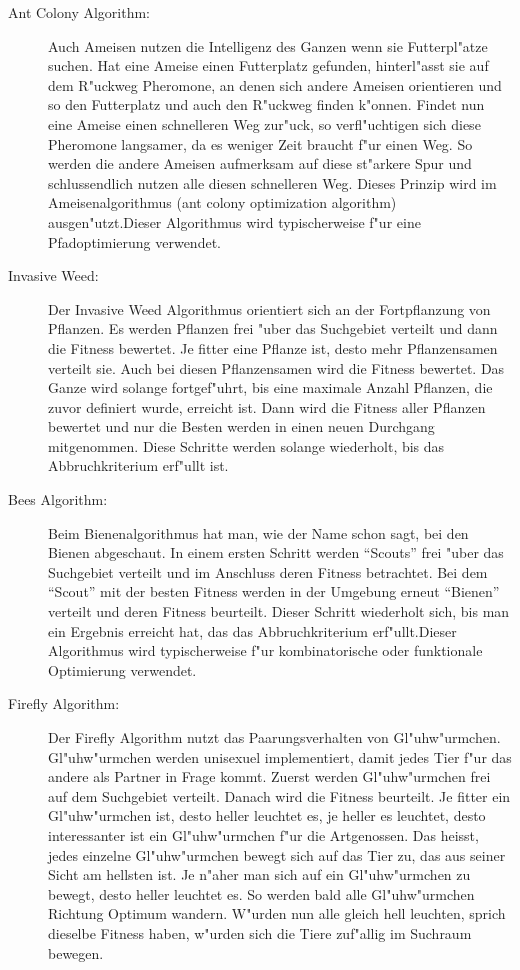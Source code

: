 \begin{description}
\item[Ant Colony Algorithm:]
Auch Ameisen nutzen die Intelligenz des Ganzen wenn sie Futterpl"atze
suchen. Hat eine Ameise einen Futterplatz gefunden, hinterl"asst sie
auf dem R"uckweg Pheromone, an denen sich andere Ameisen orientieren
und so den Futterplatz und auch den R"uckweg finden k"onnen. Findet
nun eine Ameise einen schnelleren Weg zur"uck, so verfl"uchtigen
sich diese Pheromone langsamer, da es weniger Zeit braucht f"ur einen
Weg. So werden die andere Ameisen aufmerksam auf diese st"arkere Spur und
schlussendlich nutzen alle diesen schnelleren Weg. Dieses Prinzip wird im
Ameisenalgorithmus (ant colony optimization algorithm) ausgen"utzt.Dieser
Algorithmus wird typischerweise f"ur eine Pfadoptimierung verwendet.

\item [Invasive Weed:]
Der Invasive Weed Algorithmus orientiert sich an der Fortpflanzung
von Pflanzen. Es werden Pflanzen frei "uber das Suchgebiet verteilt
und dann die Fitness bewertet. Je fitter eine Pflanze ist, desto mehr
Pflanzensamen verteilt sie. Auch bei diesen Pflanzensamen wird die
Fitness bewertet. Das Ganze wird solange fortgef"uhrt, bis eine maximale
Anzahl Pflanzen, die zuvor definiert wurde, erreicht ist. Dann wird
die Fitness aller Pflanzen bewertet und nur die Besten werden in einen
neuen Durchgang mitgenommen. Diese Schritte werden solange wiederholt,
bis das Abbruchkriterium erf"ullt ist.
		

\item [Bees Algorithm:]
Beim Bienenalgorithmus hat man, wie der Name schon sagt, bei den Bienen
abgeschaut.
In einem ersten Schritt werden ``Scouts''
frei "uber das Suchgebiet verteilt und im Anschluss deren Fitness
betrachtet. Bei dem ``Scout'' mit der besten
Fitness werden in der Umgebung erneut ``Bienen''
verteilt und deren Fitness beurteilt. Dieser Schritt wiederholt sich, bis
man ein Ergebnis erreicht hat, das das Abbruchkriterium erf"ullt.Dieser
Algorithmus wird typischerweise f"ur kombinatorische oder funktionale
Optimierung verwendet.

\item[Firefly Algorithm:]
Der Firefly Algorithm nutzt das Paarungsverhalten von
Gl"uh\-w"urm\-chen. Gl"uh\-w"urm\-chen werden unisexuel implementiert, damit
jedes Tier f"ur das andere als Partner in Frage kommt.
Zuerst werden Gl"uh\-w"urm\-chen frei auf dem Suchgebiet verteilt. Danach
wird die Fitness beurteilt. Je fitter ein Gl"uhw"urmchen ist, desto
heller leuchtet es, je heller es leuchtet, desto interessanter ist
ein Gl"uhw"urmchen f"ur die Artgenossen. Das heisst, jedes einzelne
Gl"uhw"urmchen bewegt sich auf das Tier zu, das aus seiner Sicht am
hellsten ist. Je n"aher man sich auf ein Gl"uhw"urmchen zu bewegt, desto
heller leuchtet es. So werden bald alle Gl"uhw"urmchen Richtung Optimum
wandern. W"urden nun alle gleich hell leuchten, sprich dieselbe Fitness
haben, w"urden sich die Tiere zuf"allig im Suchraum bewegen.

\end{description}
